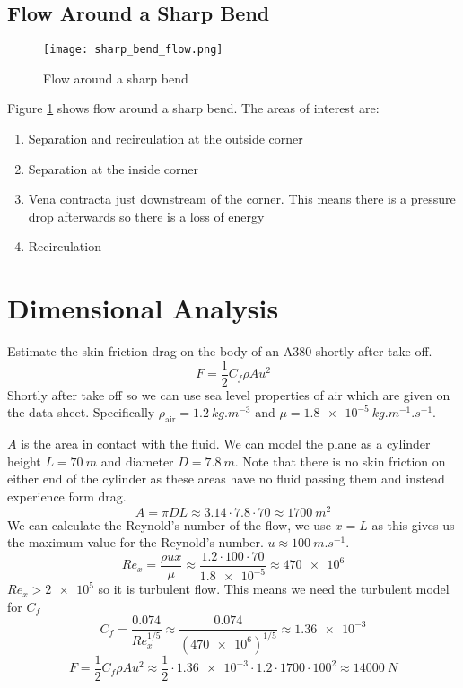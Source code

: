 \documentclass{article}
\begin{document}
    \subsection{Flow Around a Sharp Bend}
    \begin{figure}[ht]
        \centering
        \texttt{[image: sharp\_bend\_flow.png]}
        \caption{Flow around a sharp bend}
        \label{fig:sharp bend flow}
    \end{figure}
    Figure \ref{fig:sharp bend flow} shows flow around a sharp bend.
    The areas of interest are:
    \begin{enumerate}
        \item Separation and recirculation at the outside corner
        \item Separation at the inside corner
        \item Vena contracta just downstream of the corner. This means there is a pressure drop afterwards so there is a loss of energy
        \item Recirculation
    \end{enumerate}

    \section{Dimensional Analysis}
    \example
    Estimate the skin friction drag on the body of an A380 shortly after take off.
    \[F = \frac{1}{2}C_f\rho Au^2\]
    Shortly after take off so we can use sea level properties of air which are given on the data sheet.
    Specifically \(\rho_{\text{air}} = \SI{1.2}{kg.m^{-3}}\) and \(\mu = \SI{1.8e-5}{kg.m^{-1}.s^{-1}}\).
    
    \(A\) is the area in contact with the fluid. 
    We can model the plane as a cylinder height \(L = \SI{70}{m}\) and diameter \(D = \SI{7.8}{m}\). 
    Note that there is no skin friction on either end of the cylinder as these areas have no fluid passing them and instead experience form drag.
    \[A = \pi DL \approx 3.14\cdot 7.8\cdot 70\approx \SI{1700}{m^2}\]
    We can calculate the Reynold's number of the flow, we use \(x = L\) as this gives us the maximum value for the Reynold's number.
    \(u\approx\SI{100}{m.s^{-1}}\).
    \[Re_x = \frac{\rho ux}{\mu} \approx \frac{1.2\cdot 100\cdot 70}{\num{1.8e-5}}\approx \num{470e6}\]
    \(Re_x > \num{2e5}\) so it is turbulent flow. This means we need the turbulent model for \(C_f\)
    \[C_f = \frac{0.074}{Re_x^{1/5}} \approx \frac{0.074}{\left(\num{470e6}\right)^{1/5}} \approx \num{1.36e-3}\]
    \[F = \frac{1}{2}C_f\rho Au^2 \approx \frac{1}{2}\cdot \num{1.36e-3}\cdot 1.2\cdot 1700\cdot 100^2\approx \SI{14000}{N}\]
    
\end{document}
